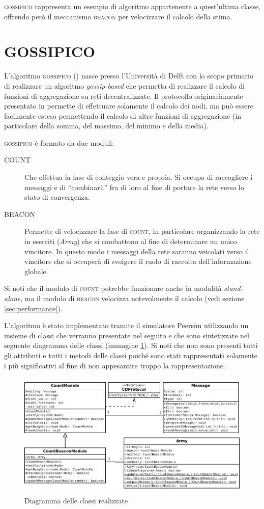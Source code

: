 \documentclass[a4paper,12pt]{article}
\begin{document}
\textsc{gossipico} rappresenta un esempio di algoritmo appartenente a quest'ultima classe, offrendo per\`o il meccanismo \textsc{beacon} per velocizzare il calcolo della stima.
\section{GOSSIPICO}
\label{sec:gossipico}

L'algoritmo \textsc{gossipico} (\cite{rif1}) nasce presso l'Universit\`a di Delft con lo scopo primario di realizzare un algoritmo \emph{gossip-based} che permetta di realizzare il calcolo di funzioni di aggregazione su reti decentralizzate. Il protocollo originariamente presentato in \cite{rif1} permette di effettuare solamente il calcolo dei nodi, ma pu\`o essere facilmente esteso permettendo il calcolo di altre funzioni di aggregazione (in particolare della somma, del massimo, del minimo e della media).

\textsc{gossipico} \`e formato da due moduli:
\begin{description}
\item[COUNT] Che effettua la fase di conteggio vera e propria. Si occupa di raccogliere i messaggi e di ``combinarli'' fra di loro al fine di portare la rete verso lo stato di convergenza.
\item[BEACON] Permette di velocizzare la fase di \textsc{count}, in particolare organizzando la rete in eserciti (\emph{Army}) che si combattono al fine di determinare un unico vincitore. In questo modo i messaggi della rete saranno veicolati verso il vincitore che si occuper\`a di svolgere il ruolo di raccolta dell'informazione globale.
\end{description}

Si noti che il modulo di \textsc{count} potrebbe funzionare anche in modalit\`a \emph{stand-alone}, ma il modulo di \textsc{beacon} velocizza notevolmente il calcolo (vedi sezione \ref{sec:performance}).

L'algoritmo \`e stato implementato tramite il simulatore Peersim utilizzando un insieme di classi che verranno presentate nel seguito e che sono sintetizzate nel seguente diagramma delle classi (immagine \ref{img:uml}). Si noti che non sono presenti tutti gli attributi e tutti i metodi delle classi poich\'e sono stati rappresentati solamente i pi\`u significativi al fine di non appesantire troppo la rappresentazione.

\begin{figure}[ht]
\centering
\includegraphics[height=6cm]{uml.png}
\caption{Diagramma delle classi realizzate}
\label{img:uml}
\end{figure}
\end{document}
